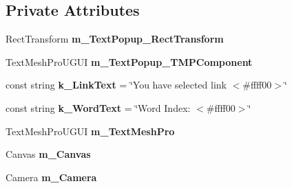 \subsection*{Private Attributes}
\begin{DoxyCompactItemize}
\item 
\mbox{\label{class_t_m_pro_1_1_examples_1_1_t_m_p___text_selector___b_a014942d86485bf0a962aba454c1a49b5}} 
Rect\+Transform {\bfseries m\+\_\+\+Text\+Popup\+\_\+\+Rect\+Transform}
\item 
\mbox{\label{class_t_m_pro_1_1_examples_1_1_t_m_p___text_selector___b_ad3a1c51fe717e5490f17240b610d1fd1}} 
Text\+Mesh\+Pro\+U\+G\+UI {\bfseries m\+\_\+\+Text\+Popup\+\_\+\+T\+M\+P\+Component}
\item 
\mbox{\label{class_t_m_pro_1_1_examples_1_1_t_m_p___text_selector___b_a4c8f925469d0800974c0c49f95cd2a0a}} 
const string {\bfseries k\+\_\+\+Link\+Text} = \char`\"{}You have selected link $<$\#ffff00$>$\char`\"{}
\item 
\mbox{\label{class_t_m_pro_1_1_examples_1_1_t_m_p___text_selector___b_a12c8e39ffc69e07a346bc5f06bd62c8b}} 
const string {\bfseries k\+\_\+\+Word\+Text} = \char`\"{}Word Index\+: $<$\#ffff00$>$\char`\"{}
\item 
\mbox{\label{class_t_m_pro_1_1_examples_1_1_t_m_p___text_selector___b_a5e4ec0a901707dc98ed6923a85ea2409}} 
Text\+Mesh\+Pro\+U\+G\+UI {\bfseries m\+\_\+\+Text\+Mesh\+Pro}
\item 
\mbox{\label{class_t_m_pro_1_1_examples_1_1_t_m_p___text_selector___b_a9f66868c1f786f39bd011421a6e68738}} 
Canvas {\bfseries m\+\_\+\+Canvas}
\item 
\mbox{\label{class_t_m_pro_1_1_examples_1_1_t_m_p___text_selector___b_aba3643c9554cb9eafa9668f7a0c23f94}} 
Camera {\bfseries m\+\_\+\+Camera}
\item 

\end{DoxyCompactItemize}
